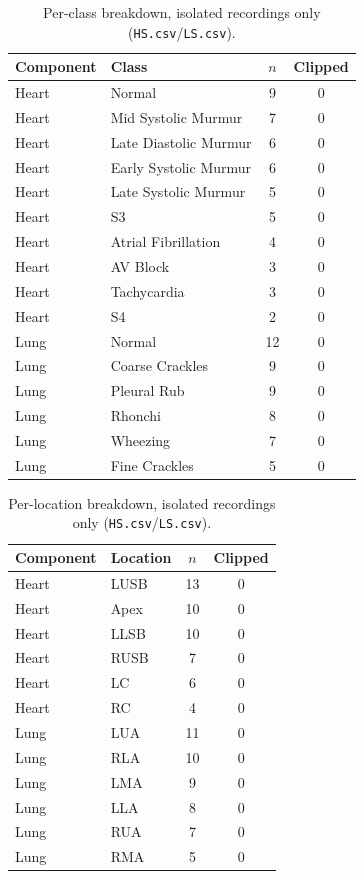 \documentclass[11pt]{article}
\begin{document}
\begin{table}[H]
\centering
\caption{Per-class breakdown, isolated recordings only (\texttt{HS.csv}/\texttt{LS.csv}).}
\label{tab:perclass}
\begin{tabular}{@{}llc c@{}}
\toprule
Component & Class & $n$ & Clipped \\
\midrule
Heart & Normal                 & 9  & 0 \\
Heart & Mid Systolic Murmur    & 7  & 0 \\
Heart & Late Diastolic Murmur  & 6  & 0 \\
Heart & Early Systolic Murmur  & 6  & 0 \\
Heart & Late Systolic Murmur   & 5  & 0 \\
Heart & S3                     & 5  & 0 \\
Heart & Atrial Fibrillation    & 4  & 0 \\
Heart & AV Block               & 3  & 0 \\
Heart & Tachycardia            & 3  & 0 \\
Heart & S4                     & 2  & 0 \\
\addlinespace
Lung  & Normal            & 12 & 0 \\
Lung  & Coarse Crackles   & 9  & 0 \\
Lung  & Pleural Rub       & 9  & 0 \\
Lung  & Rhonchi           & 8  & 0 \\
Lung  & Wheezing          & 7  & 0 \\
Lung  & Fine Crackles     & 5  & 0 \\
\bottomrule
\end{tabular}
\end{table}

\begin{table}[H]
\centering
\caption{Per-location breakdown, isolated recordings only (\texttt{HS.csv}/\texttt{LS.csv}).}
\label{tab:perlocation}
\begin{tabular}{@{}llc c@{}}
\toprule
Component & Location & $n$ & Clipped \\
\midrule
Heart & LUSB & 13 & 0 \\
Heart & Apex & 10 & 0 \\
Heart & LLSB & 10 & 0 \\
Heart & RUSB & 7  & 0 \\
Heart & LC   & 6  & 0 \\
Heart & RC   & 4  & 0 \\
\addlinespace
Lung  & LUA & 11 & 0 \\
Lung  & RLA & 10 & 0 \\
Lung  & LMA & 9  & 0 \\
Lung  & LLA & 8  & 0 \\
Lung  & RUA & 7  & 0 \\
Lung  & RMA & 5  & 0 \\
\bottomrule
\end{tabular}
\end{table}
\end{document}
